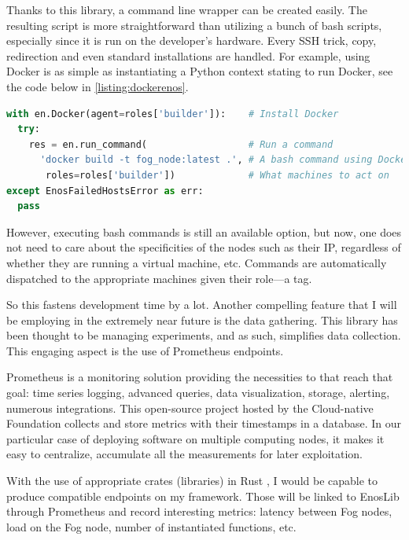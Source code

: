 Thanks to this library, a command line wrapper can be created easily. The resulting script is more straightforward than utilizing a bunch of bash scripts, especially since it is run on the developer's hardware. Every SSH trick, copy, redirection and even standard installations are handled. For example, using Docker is as simple as instantiating a Python context stating to run Docker, see the code below in \cref{listing:dockerenos}.

\begin{lstlisting}[language=Python, caption=EnosLib context example with Docker, label=listing:dockerenos]
with en.Docker(agent=roles['builder']):    # Install Docker
  try:
    res = en.run_command(                  # Run a command
      'docker build -t fog_node:latest .', # A bash command using Docker
       roles=roles['builder'])             # What machines to act on
except EnosFailedHostsError as err:
  pass
\end{lstlisting}

However, executing bash commands is still an available option, but now, one does not need to care about the specificities of the nodes such as their IP, regardless of whether they are running a virtual machine, etc. Commands are automatically dispatched to the appropriate machines given their role—a tag.

So this fastens development time by a lot. Another compelling feature that I will be employing in the extremely near future is the data gathering. This library has been thought to be managing experiments, and as such, simplifies data collection. This engaging aspect is the use of Prometheus endpoints.

Prometheus \cite{prometheus_authors_prometheus_nodate} is a monitoring solution providing the necessities to that reach that goal: time series logging, advanced queries, data visualization, storage, alerting, numerous integrations. This open-source project hosted by the Cloud-native Foundation collects and store metrics with their timestamps in a database. In our particular case of deploying software on multiple computing nodes, it makes it easy to centralize, accumulate all the measurements for later exploitation.

With the use of appropriate crates (libraries) in Rust \cite{sully_rocket_prometheus_2022}, I would be capable to produce compatible endpoints on my framework. Those will be linked to EnosLib through Prometheus and record interesting metrics: latency between Fog nodes, load on the Fog node, number of instantiated functions, etc.

